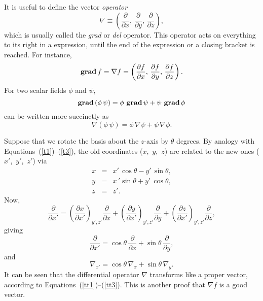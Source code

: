 It is useful to define the vector {\em operator}
\begin{equation}
\nabla \equiv \left( \frac{\partial}{\partial x},\, \frac{\partial}{\partial y},\,
\frac{\partial }{\partial z}\right),
\end{equation}
which is usually called the {\em grad} or  {\em del} operator. 
This operator acts on everything to
its right in a expression,   until the end of the expression
or a closing bracket is reached.
For instance,
\begin{equation}
{\bf grad}\,f  = \nabla f = \left(\frac{\partial f}{\partial x},\,
\frac{\partial f}{\partial y},\,\frac{\partial f}{\partial z}\right).
\end{equation}
For two scalar fields $\phi$ and $\psi$,
\begin{equation}
{\bf grad}\,(\phi \,\psi) = \phi\,\, {\bf grad}\,\psi +\psi\,\, {\bf grad}\,\phi
\end{equation}
can be written more succinctly as
\begin{equation}
\nabla(\phi\, \psi) = \phi \,\nabla\psi + \psi\, \nabla \phi.
\end{equation}

Suppose that we rotate the basis about the $z$-axis by $\theta$ degrees. 
By analogy with Equations~(\ref{t1})--(\ref{t3}), the old coordinates ($x$,\, $y$, \,$z$) are related 
to the new ones ($x'$, \,$y'$,\, $z'$) via
\begin{eqnarray}
x &=& x'\, \cos\theta - y'\,\sin\theta,\\[0.5ex]
y &=& x\,'\sin\theta +y'\,\cos\theta,\\[0.5ex]
z&=& z'.
\end{eqnarray}
Now,
\begin{equation}
\frac{\partial}{\partial x'} = \left(\frac{\partial x}{\partial x'} \right)_{y',z'}
\frac{\partial}{\partial x}+\left(\frac{\partial y}{\partial x'} \right)_{y',z'}
\frac{\partial}{\partial y}+\left(\frac{\partial z}{\partial x'} \right)_{y',z'}
\frac{\partial}{\partial z},
\end{equation}
giving
\begin{equation}
\frac{\partial}{\partial x'} = \cos\theta \,\frac{\partial}{\partial x} + 
\sin\theta \,\frac{\partial}{\partial y},
\end{equation}
and 
\begin{equation}
\nabla_{x'} = \cos\theta\, \nabla_x + \sin\theta \,\nabla_y.
\end{equation}
It can be seen that 
the differential operator $\nabla$ transforms like a proper vector,
according to Equations~(\ref{tt1})--(\ref{tt3}). This is another proof that $\nabla f$ is a good  vector.

